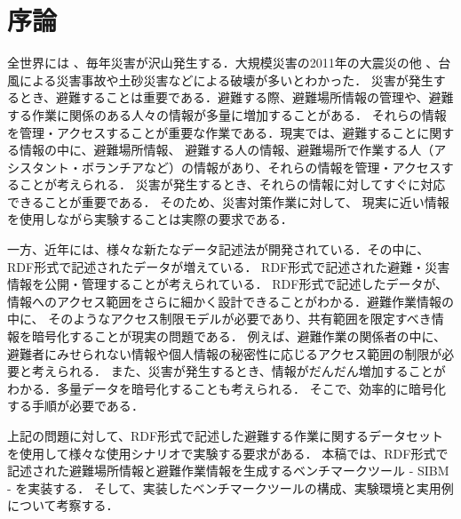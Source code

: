 ﻿%
\chapter{序論}

全世界には 、毎年災害が沢山発生する．大規模災害の2011年の大震災の他 、台風による災害事故や土砂災害などによる破壊が多いとわかった．
災害が発生するとき、避難することは重要である．避難する際、避難場所情報の管理や、避難する作業に関係のある人々の情報が多量に増加することがある．
それらの情報を管理・アクセスすることが重要な作業である．現実では、避難することに関する情報の中に、避難場所情報、
避難する人の情報、避難場所で作業する人（アシスタント・ボランチアなど）の情報があり、それらの情報を管理・アクセスすることが考えられる．
災害が発生するとき、それらの情報に対してすぐに対応できることが重要である． そのため、災害対策作業に対して、
現実に近い情報を使用しながら実験することは実際の要求である．

一方、近年には、様々な新たなデータ記述法が開発されている．その中に、RDF形式で記述されたデータが増えている．
RDF形式で記述された避難・災害情報を公開・管理することが考えられている\cite{cite:opendata}．
RDF形式で記述したデータが、情報へのアクセス範囲をさらに細かく設計できることがわかる．避難作業情報の中に、
そのようなアクセス制限モデルが必要であり、共有範囲を限定すべき情報を暗号化することが現実の問題である．
例えば、避難作業の関係者の中に、避難者にみせられない情報や個人情報の秘密性に応じるアクセス範囲の制限が必要と考えられる\cite{cite:kodama}．
また、災害が発生するとき、情報がだんだん増加することがわかる．多量データを暗号化することも考えられる．
そこで、効率的に暗号化する手順が必要である\cite{cite:dat}．

上記の問題に対して、RDF形式で記述した避難する作業に関するデータセットを使用して様々な使用シナリオで実験する要求がある．
本稿では、RDF形式で記述された避難場所情報と避難作業情報を生成するベンチマークツール - SIBM - を実装する．
そして、実装したベンチマークツールの構成、実験環境と実用例について考察する．
